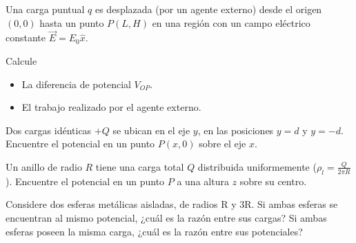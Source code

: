 \documentclass[11pt]{article}
\begin{document}
\problema
Una carga puntual $q$ es desplazada (por un agente externo) desde el origen $(0,0)$ hasta un punto $P(L, H)$ en una región con un campo eléctrico constante $\vec{E} = E_0 \hat{x}$.

Calcule
\begin{itemize}
    \item La diferencia de potencial $V_{OP}$.
    \item El trabajo realizado por el agente externo.
\end{itemize}

\problema
Dos cargas idénticas $+Q$ se ubican en el eje $y$, en las posiciones $y = d$ y $y = -d$. Encuentre el potencial en un punto $P(x, 0)$ sobre el eje $x$.

\problema
Un anillo de radio $R$ tiene una carga total $Q$ distribuida uniformemente ($\rho_l = \frac{Q}{2\pi R}$). Encuentre el potencial en un punto $P$ a una altura $z$ sobre su centro.


\problema
Considere dos esferas metálicas aisladas, de radios R y 3R. Si ambas esferas se encuentran al mismo potencial, ¿cuál
es la razón entre sus cargas? Si ambas esferas poseen la misma carga, ¿cuál es la razón entre sus potenciales?
\end{document}
